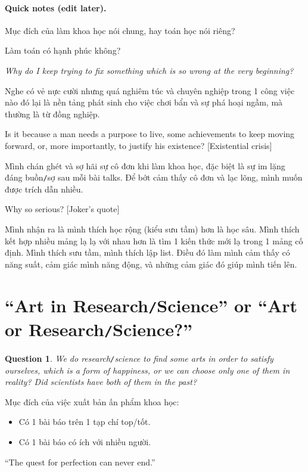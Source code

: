\documentclass{article}
\numberwithin{equation}{section}
\newtheorem{ques}{Question}[section]
\begin{document}
\paragraph{Quick notes (edit later).}
Mục đích của làm khoa học nói chung, hay toán học nói riêng?

Làm toán có hạnh phúc không?

\textit{Why do I keep trying to fix something which is so wrong at the very beginning?}

Nghe có vẻ nực cười nhưng quá nghiêm túc và chuyên nghiệp trong 1 công việc nào đó lại là nền tảng phát sinh cho việc chơi bẩn và sự phá hoại ngầm, mà thường là từ đồng nghiệp.

Is it because a man needs a purpose to live, some achievements to keep moving forward, or, more importantly, to justify his existence? [Existential crisis]

Mình chán ghét và sợ hãi sự cô đơn khi làm khoa học, đặc biệt là sự im lặng đáng buồn\texttt{/}sợ sau mỗi bài talks. Để bớt cảm thấy cô đơn và lạc lõng, mình muốn được trích dẫn nhiều.

Why so serious? [Joker's quote]

Mình nhận ra là mình thích học rộng (kiểu sưu tầm) hơn là học sâu. Mình thích kết hợp nhiều mảng lạ lạ với nhau hơn là tìm 1 kiến thức mới lạ trong 1 mảng cố định. Mình thích sưu tầm, mình thích lập list. Điều đó làm mình cảm thấy có năng suất, cảm giác mình năng động, và những cảm giác đó giúp mình tiến lên.


\section{``Art in Research\texttt{/}Science'' or ``Art or Research\texttt{/}Science?''}
\begin{ques}
	We do research\texttt{/}science to find some arts in order to satisfy ourselves, which is a form of happiness, or we can choose only one of them in reality? Did scientists have both of them in the past?
\end{ques}

Mục đích của việc xuất bản ấn phẩm khoa học:
\begin{itemize}
	\item Có 1 bài báo trên 1 tạp chí top/tốt.
	\item Có 1 bài báo có ích với nhiều người.
\end{itemize}

``The quest for perfection can never end.''
\end{document}
